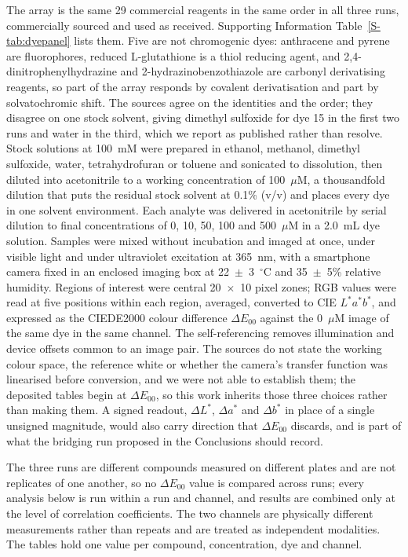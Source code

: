 \documentclass[journal=jacsat,manuscript=article,margin=1in]{achemso}
\begin{document}
The array is the same 29 commercial reagents in the same order in all three
runs, commercially sourced and used as received. Supporting Information
Table~\ref{S-tab:dyepanel} lists them. Five are not chromogenic dyes:
anthracene and pyrene are fluorophores, reduced L-glutathione is a thiol
reducing agent, and 2,4-dinitrophenylhydrazine and 2-hydrazinobenzothiazole
are carbonyl derivatising reagents, so part of the array responds by covalent
derivatisation and part by solvatochromic shift. The sources agree on the
identities and the order; they disagree on one stock solvent, giving dimethyl
sulfoxide for dye 15 in the first two runs and water in the third, which we
report as published rather than resolve. Stock solutions at 100~mM were prepared in ethanol, methanol,
dimethyl sulfoxide, water, tetrahydrofuran or toluene and sonicated to
dissolution, then diluted into acetonitrile to a working concentration of
100~$\mu$M, a thousandfold dilution that puts the residual stock solvent at
0.1\% (v/v) and
places every dye in one solvent environment. Each analyte was delivered in
acetonitrile by serial dilution to final concentrations of 0, 10, 50, 100 and
500~$\mu$M in a 2.0~mL dye solution. Samples were mixed without
incubation and imaged at once, under visible light and under ultraviolet
excitation at 365~nm, with a smartphone camera fixed in an enclosed imaging
box at 22~$\pm$~3~$^\circ$C and 35~$\pm$~5\% relative humidity. Regions of
interest were central 20~$\times$~10 pixel zones; RGB values were read at five
positions within each region, averaged, converted to CIE $L^{*}a^{*}b^{*}$,
and expressed as the CIEDE2000 colour difference $\Delta E_{00}$ against the
0~$\mu$M image of the same dye in the same channel. The self-referencing
removes illumination and device offsets common to an image pair. The sources
do not state the working colour space, the reference white or whether the
camera's transfer function was linearised before conversion, and we were not
able to establish them; the deposited tables begin at $\Delta E_{00}$, so this
work inherits those three choices rather than making them. A signed readout,
$\Delta L^{*}$, $\Delta a^{*}$ and $\Delta b^{*}$ in place of a single
unsigned magnitude, would also carry direction that $\Delta E_{00}$ discards,
and is part of what the bridging run proposed in the Conclusions should
record.

The three runs are different compounds measured on different plates and are
not replicates of one another, so no $\Delta E_{00}$ value is compared across
runs; every analysis below is run within a run and channel, and results are
combined only at the level of correlation coefficients. The two channels are
physically different measurements rather than repeats and are treated as
independent modalities. The tables hold one value per compound,
concentration, dye and channel.
\end{document}
